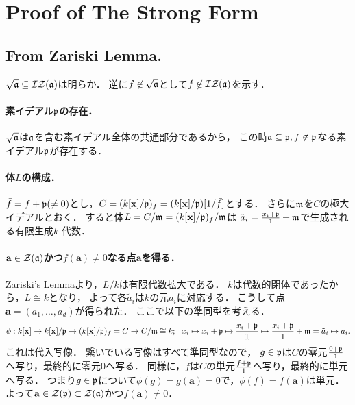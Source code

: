 \documentclass[a4paper]{jsarticle}
\newcommand{\kx}{k[\mathbf{x}]}
\begin{document}
\section{Proof of The Strong Form}
    \subsection{From Zariski Lemma.}
    $\sqrt{\mathfrak{a}} \subseteq \mathcal{I} \mathcal{Z} (\mathfrak{a})$は明らか．
    逆に$f \not \in \sqrt{\mathfrak{a}}$として$f \not \in \mathcal{I} \mathcal{Z} (\mathfrak{a})$を示す．

    \paragraph{素イデアル$\mathfrak{p}$の存在．}
    $\sqrt{\mathfrak{a}}$は$\mathfrak{a}$を含む素イデアル全体の共通部分であるから，
    この時$\mathfrak{a} \subseteq \mathfrak{p}, f \not \in \mathfrak{p}$なる素イデアル$\mathfrak{p}$が存在する．

    \paragraph{体$L$の構成．}
    $\bar{f}=f+\mathfrak{p} (\neq 0)$とし，$C=(\kx/\I{p})_f=(\kx/\I{p})[1/\bar{f}]$とする．
    さらに$\mathfrak{m}$を$C$の極大イデアルとおく．
    すると体$L=C/\I{m}=(\kx/\I{p})_f/\I{m}$は
    $\tilde{a}_i=\frac{x_i+\mathfrak{p}}{1}+\mathfrak{m}$で生成される有限生成$k$-代数．

    \paragraph{$\mathbf{a} \in \mathcal{Z}(\mathfrak{a})$かつ$f(\mathbf{a}) \neq 0$なる点$\mathbf{a}$を得る．}
    Zariski's Lemmaより，$L/k$は有限代数拡大である．
    $k$は代数的閉体であったから，$L \cong k$となり，
    よって各$\tilde{a}_i$は$k$の元$a_i$に対応する．
    こうして点$\mathbf{a}=(a_1,\dots,a_d)$が得られた．
    ここで以下の準同型を考える．
    \[
        \phi: \kx \to \kx/\I{p} \to (\kx/\I{p})_f=C \to C/\I{m} \cong k;
    ~~ x_i \mapsto x_i+\I{p} \mapsto \frac{x_i+\I{p}}{1} \mapsto \frac{x_i+\I{p}}{1}+\I{m}=\tilde{a}_i \mapsto a_i.
    \]
    これは代入写像．
    繋いでいる写像はすべて準同型なので，
    $g \in \mathfrak{p}$は$C$の零元$\frac{0+\mathfrak{p}}{1}$へ写り，最終的に零元$0$へ写る．
    同様に，$f$は$C$の単元$\frac{f+\mathfrak{p}}{1}$へ写り，最終的に単元へ写る．
    つまり$g \in \mathfrak{p}$について$\phi(g)=g(\mathbf{a})=0$で，$\phi(f)=f(\mathbf{a})$は単元．
    よって$\mathbf{a} \in \mathcal{Z}(\mathfrak{p}) \subset \mathcal{Z}(\mathfrak{a})$かつ$f(\mathbf{a}) \neq 0$．
\end{document}
